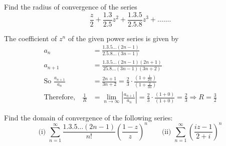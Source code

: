 \begin{exercise}
	Find the radius of convergence of the series
	$$
	\frac{z}{2}+\frac{1.3}{2.5} z^{2}+\frac{1.3 .5}{2.5 .8} z^{3}+\ldots \ldots .
	$$
\end{exercise}
\begin{answer}
	The coefficient of $z^{n}$ of the given power series is given by
	\begin{align*}
	a_{n}&=\frac{1.3 .5 \ldots(2 n-1)}{2.5 .8 \ldots(3 n-1)} \\
	a_{n+1}&=\frac{1.3 .5 \ldots(2 n-1)(2 n+1)}{25.8 \ldots(3 n-1)(3 n+2)}\\
	\text{So }\frac{a_{n+1}}{a_{n}}&=\frac{2 n+1}{3 n+2}=\frac{2}{3} \cdot \frac{\left(1+\frac{1}{2 n}\right)}{\left(1+\frac{2}{3 n}\right)}\\
	\text{Therefore,}\quad
	\frac{1}{R}&=\lim _{n \rightarrow \infty}\left|\frac{a_{n+1}}{a_{n}}\right|=\frac{2}{3} \cdot \frac{(1+0)}{(1+0)}=\frac{2}{3} \Rightarrow R=\frac{3}{2}
	\end{align*}
\end{answer}
\begin{exercise}
	 Find the domain of convergence of the following series:\\
	$$\text{(i) } \sum_{n=1}^{\infty} \frac{1.3 .5 \ldots(2 n-1)}{n !}\left(\frac{1-z}{z}\right)^{n}\qquad
	\text{(ii) }\sum_{n=1}^{\infty}\left(\frac{i z-1}{2+i}\right)^{n}$$
\end{exercise}

